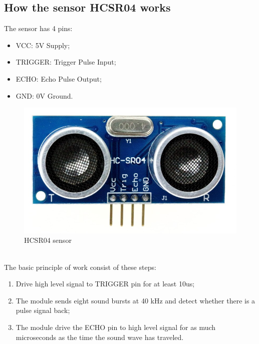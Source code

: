 \subsection{How the sensor HCSR04 works}
\begin{minipage}{0.5\textwidth}
The sensor has 4 pins:
\begin{itemize}
\item VCC: 5V Supply; 
\item TRIGGER: Trigger Pulse Input;
\item ECHO: Echo Pulse Output;
\item GND: 0V Ground.
\end{itemize} 
\end{minipage}
\begin{minipage}{0.5\textwidth}
\begin{figure}[H]
\includegraphics[width=\textwidth]{figures/raster/HCSR04}
\caption{\label{fig:sensor} HCSR04 sensor}
\end{figure}
\end{minipage} \hfill \\[1cm]

The basic principle of work consist of these steps:
\begin{enumerate}
\item Drive high level signal to TRIGGER pin for at least 10us;
\item The module sends eight sound bursts  at 40 kHz and detect whether there is a
pulse signal back;
\item The module drive the ECHO pin to high level signal for as much microseconds as the time the sound wave has traveled. 
\end{enumerate} 
